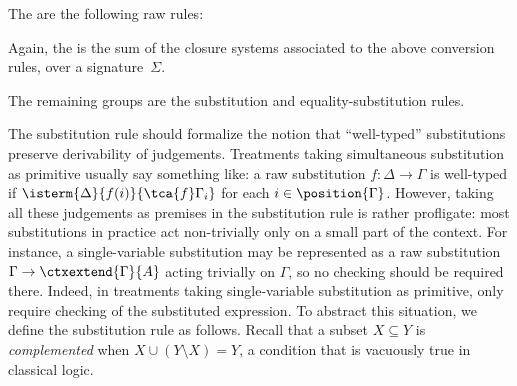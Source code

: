 \begin{definition}
  \label{def:conversion-rule}%
  The  are the following raw rules:
%
Again, the  is the sum of the closure systems associated to the above conversion rules, over a signature~$\Sigma$.
\end{definition}

The remaining groups are the substitution and equality-substitution rules.

The substitution rule should formalize the notion that ``well-typed'' substitutions preserve derivability of judgements.
%
Treatments taking simultaneous substitution as primitive usually say something like: a raw substitution $f : \Delta \to \Gamma$ is well-typed if $\isterm{\Delta}{f(i)}{\tca{f}\Gamma_i}$ for each $i \in \position{\Gamma}$.
%
However, taking all these judgements as premises in the substitution rule is rather profligate: most substitutions in practice act non-trivially only on a small part of the context.
%
For instance, a single-variable substitution may be represented as a raw substitution $\Gamma \to \ctxextend{\Gamma}{A}$ acting trivially on $\Gamma$, so no checking should be required there.
%
Indeed, in treatments taking single-variable substitution as primitive, only require checking of the substituted expression.
%
To abstract this situation, we define the substitution rule as follows. Recall that a subset $X \subseteq Y$ is \emph{complemented} when $X \cup (Y \setminus X) = Y$, a condition that is vacuously true in classical logic.

